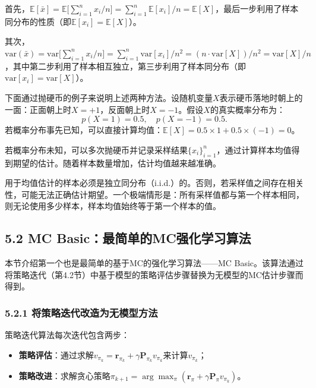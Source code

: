 \documentclass[UTF8]{article}
\begin{document}
\begin{proofbox}
    首先，$\mathbb{E}[\bar{x}] = \mathbb{E}\bigl[\sum_{i=1}^n x_i / n\bigr] = \sum_{i=1}^n \mathbb{E}[x_i]/n = \mathbb{E}[X]$，最后一步利用了样本同分布的性质（即$\mathbb{E}[x_i] = \mathbb{E}[X]$）。

    其次，$\mathrm{var}(\bar{x}) = \mathrm{var}\bigl[\sum_{i=1}^n x_i / n\bigr] = \sum_{i=1}^n \mathrm{var}[x_i]/n^2 = (n \cdot \mathrm{var}[X])/n^2 = \mathrm{var}[X]/n$，其中第二步利用了样本相互独立，第三步利用了样本同分布（即$\mathrm{var}[x_i] = \mathrm{var}[X]$）。
\end{proofbox}

下面通过抛硬币的例子来说明上述两种方法。设随机变量$X$表示硬币落地时朝上的一面：正面朝上时$X = +1$，反面朝上时$X = -1$。假设$X$的真实概率分布为：
\[
p(X = 1) = 0.5, \quad p(X = -1) = 0.5 .
\]
若概率分布事先已知，可以直接计算均值：$\mathbb{E}[X] = 0.5 \times 1 + 0.5 \times (-1) = 0$。

若概率分布未知，可以多次抛硬币并记录采样结果$\{x_i\}_{i=1}^n$，通过计算样本均值得到期望的估计。随着样本数量增加，估计均值越来越准确。

\begin{remarkbox}
    用于均值估计的样本必须是独立同分布（i.i.d.）的。否则，若采样值之间存在相关性，可能无法正确估计期望。一个极端情形是：所有采样值都与第一个样本相同，则无论使用多少样本，样本均值始终等于第一个样本的值。
\end{remarkbox}

\subsection*{5.2 MC Basic：最简单的MC强化学习算法}

本节介绍第一个也是最简单的基于MC的强化学习算法——MC Basic。该算法通过将策略迭代（第4.2节）中基于模型的策略评估步骤替换为无模型的MC估计步骤而得到。

\subsubsection*{5.2.1 将策略迭代改造为无模型方法}

策略迭代算法每次迭代包含两步：
\begin{itemize}
    \item \textbf{策略评估}：通过求解$v_{\pi_k} = \boldsymbol{r}_{\pi_k} + \gamma \boldsymbol{P}_{\pi_k} v_{\pi_k}$来计算$v_{\pi_k}$；
    \item \textbf{策略改进}：求解贪心策略$\pi_{k+1} = \arg\max_{\pi} (\boldsymbol{r}_{\pi} + \gamma \boldsymbol{P}_{\pi} v_{\pi_k})$。
\end{itemize}
\end{document}

